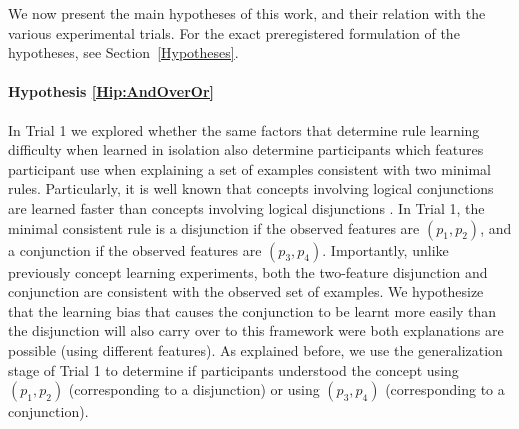 \color{blue} We now present the main hypotheses of this work, and their relation with the various experimental trials. For the exact preregistered formulation of the hypotheses, see Section~\ref{Hypotheses}. \color{black}

\paragraph{Hypothesis \ref{Hip:AndOverOr}}
In Trial 1 we explored whether the same factors that determine rule learning difficulty when learned in isolation also determine participants which features participant use when explaining a set of examples consistent with two minimal rules. Particularly, it is well known %
that concepts involving logical conjunctions are learned faster than concepts involving logical disjunctions \cite{bourne1970knowing}. %
In Trial 1, the minimal consistent rule is a disjunction if the observed features are $(p_1, p_2)$, and a conjunction if the observed features are $(p_3, p_4)$. Importantly, unlike previously concept learning experiments, both the two-feature disjunction and conjunction are consistent with the observed set of examples. We hypothesize that the learning bias that causes the conjunction to be learnt more easily than the disjunction will also carry over to this framework were both explanations are possible (using different features). 
As explained before, we use the generalization stage of Trial 1 to determine if participants understood the concept using $(p_1, p_2)$ (corresponding to a disjunction) or using $(p_3, p_4)$ (corresponding to a conjunction).



